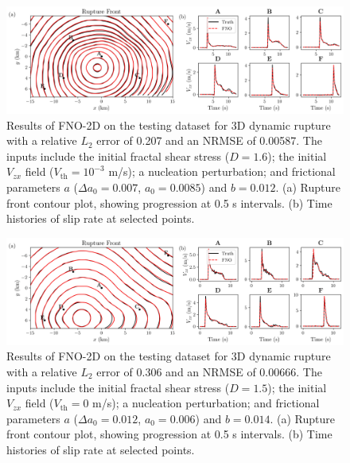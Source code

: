 \documentclass[a4paper,11pt]{article}
\begin{document}
\begin{figure}[H]
    \centering
    \includegraphics[width=1.0\linewidth]{figures/V2/si/3D/2.png}
    \caption{\label{fig:3D_mu_std}
    Results of FNO-2D on the testing dataset for 3D dynamic rupture with a relative \(L_2\) error of 0.207 and an NRMSE of 0.00587. The inputs include the initial fractal shear stress (\(D = 1.6\)); the initial \(V_{zx}\) field (\(V_\text{th} = 10^{-3}\) m/s); a nucleation perturbation; and frictional parameters \(a\) (\(\Delta a_0 = 0.007\), \(a_0 = 0.0085\)) and \(b = 0.012\). (a) Rupture front contour plot, showing progression at 0.5 s intervals. (b) Time histories of slip rate at selected points.
    }
\end{figure}

\begin{figure}[H]
    \centering
    \includegraphics[width=1.0\linewidth]{figures/V2/si/3D/3.png}
    \caption{\label{fig:3D_mu_3std}Results of FNO-2D on the testing dataset for 3D dynamic rupture with a relative \(L_2\) error of 0.306 and an NRMSE of 0.00666. The inputs include the initial fractal shear stress (\(D = 1.5\)); the initial \(V_{zx}\) field (\(V_\text{th} = 0\) m/s); a nucleation perturbation; and frictional parameters \(a\) (\(\Delta a_0 = 0.012\), \(a_0 = 0.006\)) and \(b = 0.014\). (a) Rupture front contour plot, showing progression at 0.5 s intervals. (b) Time histories of slip rate at selected points.
    }
\end{figure}
\end{document}
